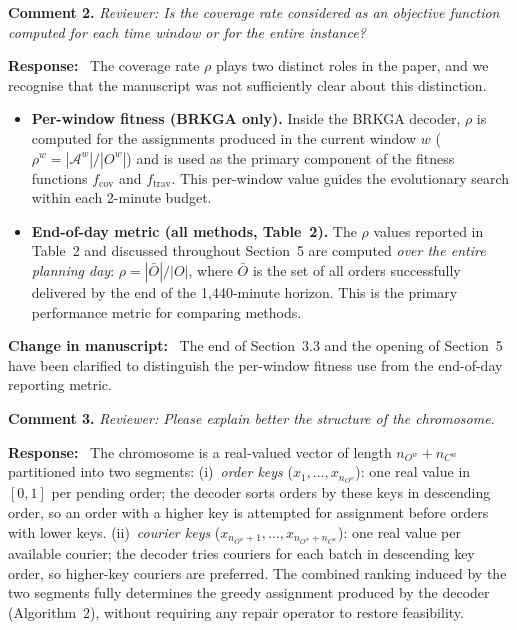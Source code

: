 \documentclass[12pt]{article}
\newcommand{\rev}[1]{\textcolor{revcolor}{\textit{Reviewer: #1}}}
\newcommand{\resp}{\noindent\textbf{Response:}\ }
\newcommand{\change}{\noindent\textbf{Change in manuscript:}\ }
\begin{document}
\bigskip

\noindent\textbf{Comment 2.}
\rev{Is the coverage rate considered as an objective function
computed for each time window or for the entire instance?}

\resp
The coverage rate $\rho$ plays two distinct roles in the paper,
and we recognise that the manuscript was not sufficiently clear
about this distinction.

\begin{itemize}
  \item \textbf{Per-window fitness (BRKGA only).}
  Inside the BRKGA decoder, $\rho$ is computed for the
  assignments produced in the current window $w$
  ($\rho^w = |\mathcal{A}^w| / |O^w|$) and is used as
  the primary component of the fitness functions $f_{\text{cov}}$
  and $f_{\text{trav}}$.
  This per-window value guides the evolutionary search within
  each 2-minute budget.

  \item \textbf{End-of-day metric (all methods, Table~2).}
  The $\rho$ values reported in Table~2 and discussed throughout
  Section~5 are computed \emph{over the entire planning day}:
  $\rho = |\bar{O}|/|O|$, where $\bar{O}$ is the set of
  all orders successfully delivered by the end of the 1,440-minute
  horizon. This is the primary performance metric for comparing
  methods.
\end{itemize}

\change
The end of Section~3.3 and the opening of Section~5 have been
clarified to distinguish the per-window fitness use from the
end-of-day reporting metric.

\bigskip

\noindent\textbf{Comment 3.}
\rev{Please explain better the structure of the chromosome.}

\resp
The chromosome is a real-valued vector of length
$n_{O^w} + n_{C^w}$ partitioned into two segments:
(i)~\emph{order keys} ($x_1, \ldots, x_{n_{O^w}}$): one
real value in $[0,1]$ per pending order; the decoder sorts
orders by these keys in descending order, so an order with
a higher key is attempted for assignment before orders with
lower keys.
(ii)~\emph{courier keys} ($x_{n_{O^w}+1}, \ldots,
x_{n_{O^w}+n_{C^w}}$): one real value per available courier;
the decoder tries couriers for each batch in descending key
order, so higher-key couriers are preferred.
The combined ranking induced by the two segments fully
determines the greedy assignment produced by the decoder
(Algorithm~2), without requiring any repair operator to
restore feasibility.
\end{document}
